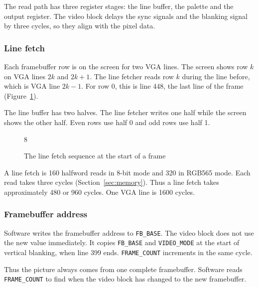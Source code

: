 The read path has three register stages: the line buffer, the palette and the output register. The video block delays the sync signals and the blanking signal by three cycles, so they align with the pixel data.

\subsubsection{Line fetch}
Each framebuffer row is on the screen for two VGA lines. The screen shows row $k$ on VGA lines $2k$ and $2k + 1$. The line fetcher reads row $k$ during the line before, which is VGA line $2k - 1$. For row 0, this is line 448, the last line of the frame (Figure~\ref{fig:linefetch}).

The line buffer has two halves. The line fetcher writes one half while the screen shows the other half. Even rows use half 0 and odd rows use half 1.

\begin{figure}[H]
  \centering
  \begin{waveform}[1.4cm]{8}
  \end{waveform}
  \caption{The line fetch sequence at the start of a frame}
  \label{fig:linefetch}
\end{figure}

A line fetch is 160 halfword reads in 8-bit mode and 320 in RGB565 mode. Each read takes three cycles (Section~\ref{sec:memory}). Thus a line fetch takes approximately 480 or 960 cycles. One VGA line is 1600 cycles.

\subsubsection{Framebuffer address}
Software writes the framebuffer address to \texttt{FB\_BASE}. The video block does not use the new value immediately. It copies \texttt{FB\_BASE} and \texttt{VIDEO\_MODE} at the start of vertical blanking, when line 399 ends. \texttt{FRAME\_COUNT} increments in the same cycle.

Thus the picture always comes from one complete framebuffer. Software reads \texttt{FRAME\_COUNT} to find when the video block has changed to the new framebuffer.

